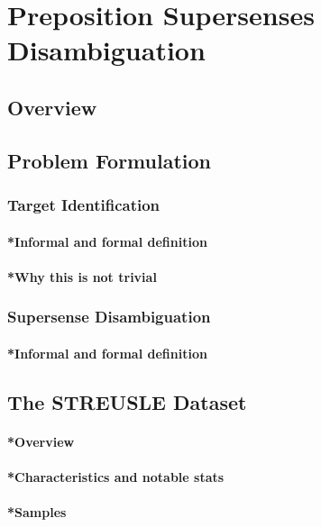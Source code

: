 
\chapter{Preposition Supersenses Disambiguation} %

\label{Chapter2} %

\section{Overview}

\section{Problem Formulation}
\subsection{Target Identification}
\subsubsection{*Informal and formal definition}
\subsubsection{*Why this is not trivial}
\subsection{Supersense Disambiguation}
\subsubsection{*Informal and formal definition}

\section{The STREUSLE Dataset}
\subsubsection{*Overview}
\subsubsection{*Characteristics and notable stats}
\subsubsection{*Samples}

